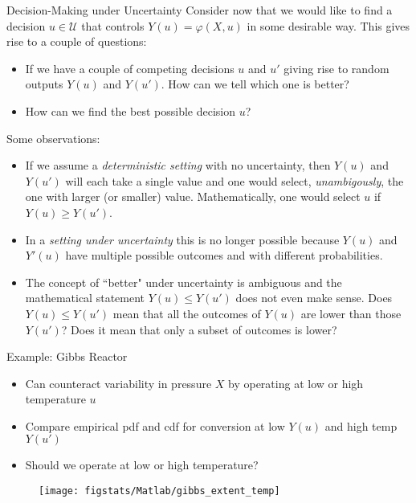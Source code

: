 \documentclass[9pt]{beamer}
\begin{document}
%
\begin{frame}{Decision-Making under Uncertainty}
Consider now that we would like to find a decision $u\in \mathcal{U}$ that controls $Y(u)=\varphi(X,u)$ in some desirable way. This gives rise to a couple of questions:
\begin{block}{}
\begin{itemize}
\item If we have a couple of competing decisions $u$ and $u'$ giving rise to random outputs $Y(u)$ and $Y(u')$. How can we tell which one is better? 

\item How can we find the best possible decision $u$?
\end{itemize}
\end{block}
Some observations: 
\begin{itemize}
 \setlength{\itemsep}{5pt}
\item If we assume a {\em deterministic setting} with no uncertainty, then $Y(u)$ and $Y(u')$ will each take a single value and one would select, {\em unambigously},  the one with larger (or smaller) value. Mathematically, one would select $u$ if $Y(u)\geq Y(u')$.   

\item In a {\em setting under uncertainty} this is no longer possible because $Y(u)$ and $Y'(u)$ have multiple possible outcomes and with different probabilities. 

\item The concept of ``better" under uncertainty is ambiguous and the mathematical statement $Y(u)\leq Y(u')$ does not even make sense. Does $Y(u)\leq Y(u')$ mean that all the outcomes of $Y(u)$ are lower than those $Y(u')$? Does it mean that only a subset of outcomes is lower? 
\end{itemize}

\end{frame}

\begin{frame}{Example: Gibbs Reactor}
\begin{itemize}
 \setlength{\itemsep}{5pt}
\item Can counteract variability in pressure $X$ by operating at low or high temperature $u$
\item Compare empirical pdf and cdf for conversion at low $Y(u)$ and high temp $Y(u')$
\item Should we operate at low or high temperature?
\end{itemize}
\begin{figure}[!htb]
    \centering
	\texttt{[image: figstats/Matlab/gibbs\_extent\_temp]}
\end{figure}

\end{frame}
\end{document}
